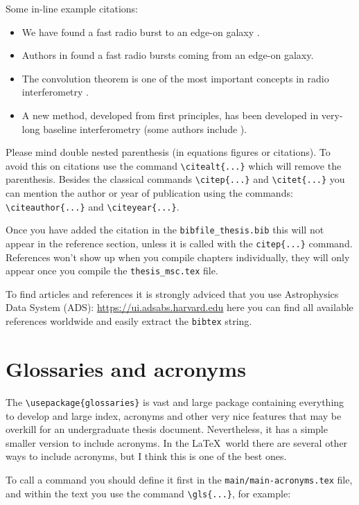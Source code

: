 Some in-line example citations:
\begin{itemize}
  \item We have found a fast radio burst to an edge-on galaxy \citep{2024NatAs...8.1429C}.
  \item Authors in \citet{2024NatAs...8.1429C} found a fast radio bursts coming from an edge-on galaxy.
  \item The convolution theorem is one of the most important concepts in radio interferometry \citep[see][chapter~3]{1965ftia.book.....B}.
  \item A new method, developed from first principles, has been developed in very-long baseline interferometry (some authors include \citealt{1965ftia.book.....B}).
\end{itemize}

Please mind double nested parenthesis (in equations figures or citations). To avoid this on citations use the command \verb|\citealt{...}| which will remove the parenthesis. Besides the classical commands \verb|\citep{...}| and \verb|\citet{...}| you can mention the author or year of publication using the commands: \verb|\citeauthor{...}| and \verb|\citeyear{...}|.

Once you have added the citation in the \texttt{bibfile\_thesis.bib} this will not appear in the reference section, unless it is called with the \texttt{citep\{...\}} command. References won't show up when you compile chapters individually, they will only appear once you compile the \texttt{thesis\_msc.tex} file.

To find articles and references it is strongly adviced that you use Astrophysics Data System (ADS): \url{https://ui.adsabs.harvard.edu} here you can find all available references worldwide and easily extract the \texttt{bibtex} string.

\section{Glossaries and acronyms}

The \verb|\usepackage{glossaries}| is vast and large package containing everything to develop and large index, acronyms and other very nice features that may be overkill for an undergraduate thesis document. Nevertheless, it has a simple smaller version to include acronyms. In the \LaTeX\ world there are several other ways to include acronyms, but I think this is one of the best ones. 

To call a command you should define it first in the \texttt{main/main-acronyms.tex} file, and within the text you use the command \verb|\gls{...}|, for example:

